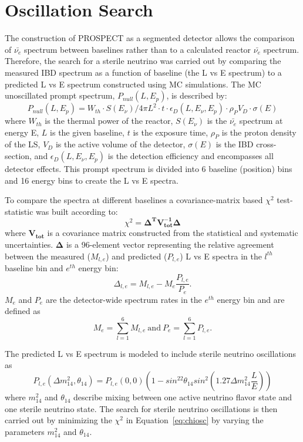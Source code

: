 \section{Oscillation Search}

The construction of PROSPECT as a segmented detector allows the comparison of $\bar{\nu_e}$ spectrum between baselines rather than to a calculated reactor $\bar{\nu_e}$ spectrum. 
Therefore, the search for a sterile neutrino was carried out by comparing the measured IBD spectrum as a function of baseline (the L vs E spectrum) to a predicted L vs E spectrum constructed using MC simulations. 
The MC unoscillated prompt spectrum, $P_{null}(L,E_p)$, is described by:
\begin{equation}
	P_{null}(L,E_p) = W_{th} \cdot S(E_\nu)/4\pi L^2 \cdot t \cdot \epsilon_D(L,E_\nu,E_p) \cdot \rho_PV_D \cdot \sigma(E)
\end{equation}
where $W_{th}$ is the thermal power of the reactor, $S(E_\nu)$ is the $\bar{\nu_{e}}$ spectrum at energy E, $L$ is the given baseline, $t$ is the exposure time, $\rho_P$ is the proton density of the LS, $V_D$ is the active volume of the detector, $\sigma(E)$ is the IBD cross-section, and $\epsilon_D(L,E_\nu,E_p)$ is the detection efficiency and encompasses all detector effects.
This prompt spectrum is divided into 6 baseline (position) bins and 16 energy bins to create the L vs E spectra.

To compare the spectra at different baselines a covariance-matrix based $\chi^2$ test-statistic was built according to:
\begin{equation}	
	\chi^2 = \mathbf{\Delta^TV^{-1}_{tot}\Delta}
	\label{eq:chiosc}
\end{equation}
where $\mathbf{V_{tot}}$ is a covariance matrix constructed from the statistical and systematic uncertainties.
$\mathbf{\Delta}$ is a 96-element vector representing the relative agreement between the measured ($M_{l,e}$) and predicted ($P_{l,e}$) L vs E spectra in the $l^{th}$ baseline bin and $e^{th}$ energy bin:
\begin{equation}
	\Delta_{l,e} = M_{l,e} - M_e\frac{P_{l,e}}{P_e}.
	\label{eq:deltaosc}
\end{equation}
$M_e$ and $P_e$ are the detector-wide spectrum rates in the $e^{th}$ energy bin and are defined as
\begin{equation}
	M_e = \sum_{l=1}^{6}M_{l,e}~\textrm{and}~P_e = \sum_{l=1}^{6}P_{l,e}.
\end{equation}

The predicted L vs E spectrum is modeled to include sterile neutrino oscillations as
\begin{equation}
	P_{l,e}(\Delta m_{14}^2,\theta_{14}) = P_{l,e}(0,0)\left(1-sin^22\theta_{14}sin^2\left(1.27\Delta m_{14}^2\frac{L}{E}   \right)\right)
\end{equation}
where $m_{14}^2$ and $\theta_{14}$ describe mixing between one active neutrino flavor state and one sterile neutrino state.
The search for sterile neutrino oscillations is then carried out by minimizing the $\chi^2$ in Equation~\ref{eq:chiosc} by varying the parameters $m_{14}^2$ and $\theta_{14}$.

